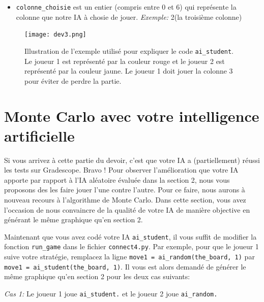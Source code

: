 \documentclass[11pt,answers]{exam}
\begin{document}
\begin{itemize}
	\item \texttt{colonne\_choisie} est un entier (compris entre 0 et 6) qui représente la colonne que notre IA à chosie de jouer. \emph{Exemple:} 2(la troisième colonne)
\end{itemize}

\bigskip

\begin{figure}[!h]
	\centering
	\texttt{[image: dev3.png]}
 	\caption{Illustration de l'exemple utilisé pour expliquer le code \texttt{ai\_student}. Le joueur 1 est représenté par la couleur rouge et le joueur 2 est représenté par la couleur jaune. Le joueur 1 doit jouer la colonne 3 pour éviter de perdre la partie.}
	\label{fig:ex_sec3}
\end{figure}

\newpage

\section{Monte Carlo avec votre intelligence artificielle}

Si vous arrivez à cette partie du devoir, c'est que votre IA a (partiellement) réussi les tests sur Gradescope. Bravo ! Pour observer l'amélioration que votre IA apporte par rapport à l'IA aléatoire évaluée dans la section 2, nous vous proposons des les faire jouer l'une contre l'autre. Pour ce faire, nous aurons à nouveau recours à l'algorithme de Monte Carlo. Dans cette section, vous avez l'occasion de nous convaincre de la qualité de votre IA de manière objective en générant le même graphique qu'en section 2.

\bigskip

Maintenant que vous avez codé votre IA \texttt{ai\_student}, il vous suffit de modifier la fonction \texttt{run\_game} dans le fichier \texttt{connect4.py}. Par exemple, pour que le joueur 1 suive votre stratégie, remplacez la ligne \texttt{move1 = ai\_random(the\_board, 1)} par \texttt{move1 = ai\_student(the\_board, 1)}. Il vous est alors demandé de générer le même graphique qu'en section 2 pour les deux cas suivants:

\newpage

\emph{Cas 1:} Le joueur 1 joue \texttt{ai\_student.} et le joueur 2 joue \texttt{ai\_random.}
\end{document}
